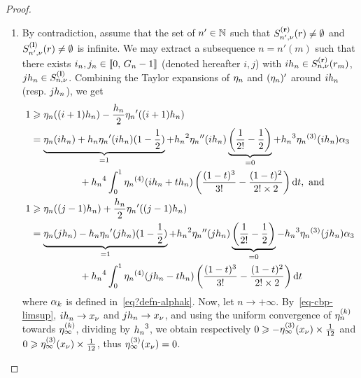 \begin{proof}
\begin{enumerate}
\item By contradiction, assume that the set of $n'\in\mathbb{N}$ such that $S_{n',\nu}^{\mathbf{(r)}}(r)\neq \emptyset$ and $S_{n',\nu}^{\mathbf{(l)}}(r)\neq \emptyset$ is infinite. We may extract a subsequence $n=n'(m)$ such that there exists $i_n,j_n\in\llbracket 0,\,{G_n}-1 \rrbracket$ (denoted hereafter $i,j$) with $i{h_n}\in S_{n,\nu}^{\mathbf{(r)}}(r_m)$, $j{h_n}\in S_{n,\nu}^{\mathbf{(l)}}$.
 Combining the Taylor expansions of $\eta_n$ and $({\eta_n})'$ around $i{h_n}$ (resp. $j{h_n}$), we get
\begin{align*}
  1&\geq \mun((i+1)\stepsizen)-\frac{\stepsizen}{2}{\mun}'((i+1)\stepsizen)\\
   & =  \underbrace{\mun(i\stepsizen) +\stepsizen{\mun}'(i\stepsizen)(1-\frac{1}{2} )}_{=1} +\stepsizen^2{\mun}''(i\stepsizen)\underbrace{\left(\frac{1}{2!} -\frac{1}{2}\right)}_{=0} + \stepsizen^3 {\mun}^{(3)}(i\stepsizen)\al_3\\
   & \qquad\qquad+ \stepsizen^4\int_0^1 {\mun}^{(4)}(i\stepsizen+t\stepsizen)\left(\frac{(1-t)^3}{3!} -\frac{(1-t)^2}{2!\times 2}\right)\d t, \mbox{ and }\\
  1&\geq \mun((j-1)\stepsizen)+\frac{\stepsizen}{2}{\mun}'((j-1)\stepsizen)\\
   & =  \underbrace{\mun(j\stepsizen) -\stepsizen{\mun}'(j\stepsizen)(1-\frac{1}{2} )}_{=1} +\stepsizen^2{\mun}''(j\stepsizen)\underbrace{\left(\frac{1}{2!} -\frac{1}{2}\right)}_{=0} -\stepsizen^3 {\mun}^{(3)}(j\stepsizen)\al_3\\
   & \qquad\qquad+ \stepsizen^4\int_0^1 {\mun}^{(4)}(j\stepsizen-t\stepsizen)\left(\frac{(1-t)^3}{3!} -\frac{(1-t)^2}{2!\times 2}\right)\d t
\end{align*}
where $\alpha_k$ is defined in~\eqref{eq?defn-alphak}.
Now, let $n\to +\infty$. By~\eqref{eq-cbp-limsup}, $i{h_n}\to x_{\nu}$ and $j{h_n}\to x_\nu$, and using the uniform convergence of $\eta_n^{(k)}$ towards $\eta_\infty^{(k)}$, dividing by ${h_n}^3$, we obtain respectively $0\geqslant -\eta_\infty^{(3)}(x_\nu)\times\frac{1}{12}$ and $0\geqslant \eta_\infty^{(3)}(x_\nu)\times \frac{1}{12}$, thus $\eta_\infty^{(3)}(x_\nu)=0$.


\end{enumerate}
\end{proof}
